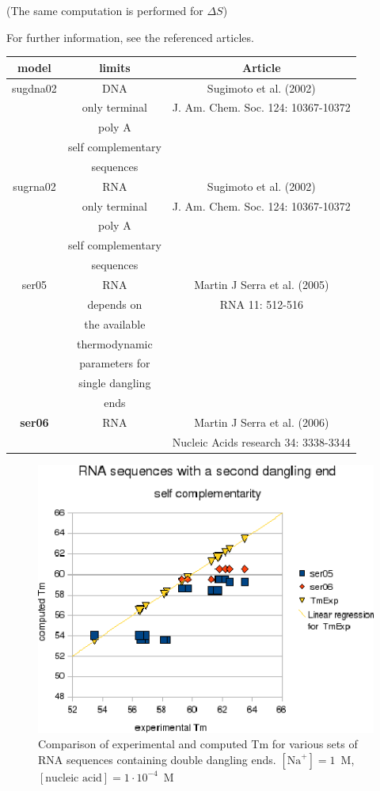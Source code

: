 \documentclass{article}
\begin{document}
       (The same computation is performed for $\Delta S$)

For further information, see the referenced articles.

\begin{table}[hc]
\begin{tabular}[h]{| c | c | c |}
\textbf{model} & \textbf{limits} & \textbf{Article} \\
\hline
sugdna02 & DNA & Sugimoto et al. (2002)\\
 & only terminal & J. Am. Chem. Soc. 124: 10367-10372 \\
 & poly A & \\
 & self complementary & \\
 & sequences & \\
 \hline
sugrna02 & RNA & Sugimoto et al. (2002)\\
 & only terminal & J. Am. Chem. Soc. 124: 10367-10372 \\
 & poly A & \\
 & self complementary & \\
 & sequences & \\
 \hline
ser05 & RNA & Martin J Serra et al. (2005)\\
 & depends on & RNA 11: 512-516 \\
 & the available & \\
 & thermodynamic & \\
 & parameters for & \\
 & single dangling & \\
 & ends & \\
 \hline
\textbf{ser06} & RNA & Martin J Serra et al. (2006)\\
 & & Nucleic Acids research 34: 3338-3344 \\
\hline
\end{tabular}
\end{table}

\begin{figure}[h]
\includegraphics[width=1\linewidth]{images/RNASecondDanglingEnd}
\caption{Comparison of experimental and computed Tm for various sets of
 RNA sequences containing double dangling ends. $[\mbox{Na}^+] = 1$~M, $[\mbox{nucleic acid}] = 1\cdot{}10^{-4}$~M}
\end{figure}
\end{document}
